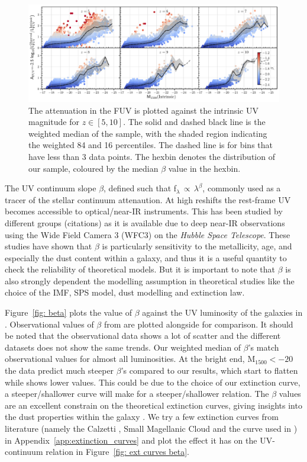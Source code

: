 \begin{figure}
	\centering
	\includegraphics[width=\textwidth]{./figures/att_lfuvintr_beta_z5_10}
	\caption{The attenuation in the FUV is plotted against the intrinsic UV magnitude for $z\in[5,10]$. The solid and dashed black line is the weighted median of the sample, with the shaded region indicating the weighted 84 and 16 percentiles. The dashed line is for bins that have less than 3 data points. The hexbin denotes the distribution of our sample, coloured by the median $\beta$ value in the hexbin. \label{fig: att_lfuv_intrinsic}} 
\end{figure} 
The UV continuum slope $\beta$, defined such that f$_{\lambda}\,\propto\,\lambda^{\beta}$, commonly used as a tracer of the stellar continuum attenaution. At high reshifts the rest-frame UV becomes accessible to optical/near-IR instruments. This has been studied by different groups (citations) as it is available due to deep near-IR observations using the Wide Field Camera 3 (WFC3) on the \textit{Hubble Space Telescope}. These studies have shown that $\beta$ is particularly sensitivity to the metallicity, age, and especially the dust content within a galaxy, and thus it is a useful quantity to check the reliability of theoretical models. But it is important to note that $\beta$ is also strongly dependent the modelling assumption in theoretical studies like the choice of the IMF, SPS model, dust modelling and extinction law.   

Figure~\ref{fig: beta} plots the value of $\beta$ against the UV luminosity of the galaxies in \flares. Observational values of $\beta$ from \cite{Dunlop2012,Bouwens2012b,Bouwens2014a} are plotted alongside for comparison. It should be noted that the observational data shows a lot of scatter and the different datasets does not show the same trends. Our weighted median of $\beta$'s  match observational values for almost all luminosities. At the bright end, M$_{1500}<-20$ the \cite{Bouwens2012b,Bouwens2014a} data predict much steeper $\beta$'s compared to our results, which start to flatten while \cite{Dunlop2012} shows lower values. This could be due to the choice of our extinction curve, a steeper/shallower curve will make for a steeper/shallower relation. The $\beta$ values are an excellent constrain on the theoretical extinction curves, giving insights into the dust properties within the galaxy \citep[see][for an overview]{Salim2020}. We try a few extinction curves from literature (namely the Calzetti \citep{Calzetti2000}, Small Magellanic Cloud \citep{Pei1992} and the curve used in \citealt{Narayanan2018}) in Appendix~\ref{app:extinction_curves} and plot the effect it has on the  UV-continuum relation in Figure~\ref{fig: ext curves beta}. 

